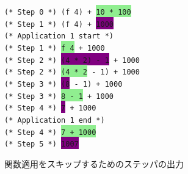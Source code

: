 \begin{figure}
\texttt{(* Step 0 *) (f 4) + \colorbox{lightgreen}{10 * 100}\\
(* Step 1 *) (f 4) + \colorbox{purple}{1000}\\
(* Application 1 start *)\\
(* Step 1 *) \colorbox{lightgreen}{f 4} + 1000\\
(* Step 2 *) \colorbox{purple}{(4 * 2) - 1} + 1000\\
(* Step 2 *) \colorbox{lightgreen}{(4 * 2} - 1) + 1000\\
(* Step 3 *) \colorbox{purple}{(8} - 1) + 1000\\
(* Step 3 *) \colorbox{lightgreen}{8 - 1} + 1000\\
(* Step 4 *) \colorbox{purple}{7} + 1000\\
(* Application 1 end *)\\
(* Step 4 *) \colorbox{lightgreen}{7 + 1000}\\
(* Step 5 *) \colorbox{purple}{1007}}
\caption{関数適用をスキップするためのステッパの出力}
\label{figure:skipping}
\end{figure}
